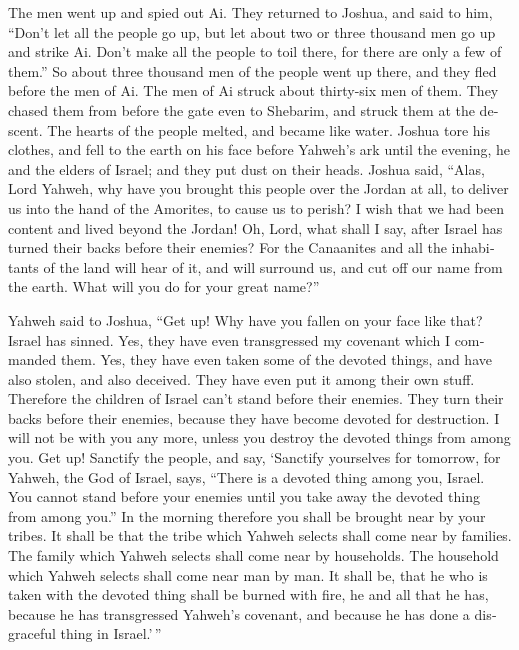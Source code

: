 \begin{paracol}{2}
\begin{otherlanguage}{english}
The men went up and spied out Ai.  They returned to
Joshua, and said to him, ``Don't let all the people go up, but let about
two or three thousand men go up and strike Ai. Don't make all the people
to toil there, for there are only a few of them.''  So
about three thousand men of the people went up there, and they fled
before the men of Ai.  The men of Ai struck about
thirty-six men of them. They chased them from before the gate even to
Shebarim, and struck them at the descent. The hearts of the people
melted, and became like water.  Joshua tore his clothes,
and fell to the earth on his face before Yahweh's ark until the evening,
he and the elders of Israel; and they put dust on their heads.
 Joshua said, ``Alas, Lord Yahweh, why have you brought
this people over the Jordan at all, to deliver us into the hand of the
Amorites, to cause us to perish? I wish that we had been content and
lived beyond the Jordan!  Oh, Lord, what shall I say,
after Israel has turned their backs before their enemies? 
For the Canaanites and all the inhabitants of the land will hear of it,
and will surround us, and cut off our name from the earth. What will you
do for your great name?''

 Yahweh said to Joshua, ``Get up! Why have you fallen on
your face like that?  Israel has sinned. Yes, they have
even transgressed my covenant which I commanded them. Yes, they have
even taken some of the devoted things, and have also stolen, and also
deceived. They have even put it among their own stuff. 
Therefore the children of Israel can't stand before their enemies. They
turn their backs before their enemies, because they have become devoted
for destruction. I will not be with you any more, unless you destroy the
devoted things from among you.  Get up! Sanctify the
people, and say, `Sanctify yourselves for tomorrow, for Yahweh, the God
of Israel, says, ``There is a devoted thing among you, Israel. You
cannot stand before your enemies until you take away the devoted thing
from among you.''  In the morning therefore you shall be
brought near by your tribes. It shall be that the tribe which Yahweh
selects shall come near by families. The family which Yahweh selects
shall come near by households. The household which Yahweh selects shall
come near man by man.  It shall be, that he who is taken
with the devoted thing shall be burned with fire, he and all that he
has, because he has transgressed Yahweh's covenant, and because he has
done a disgraceful thing in Israel.'\,''


\end{otherlanguage}
\end{paracol}
